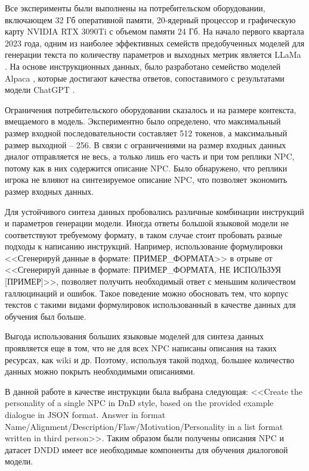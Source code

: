 Все эксперименты были выполнены на потребительском оборудовании, включающем 32 Гб оперативной памяти, 20-ядерный процессор и графическую карту NVIDIA RTX 3090Ti с объемом памяти 24 Гб. На начало первого квартала 2023 года, одним из наиболее эффективных семейств предобученных моделей для генерации текста по количеству параметров и выходных метрик является LLaMa \cite{llama-paper}. На основе инструкционных данных, было разработано семейство моделей Alpaca \cite{alpaca-docs}, которые достигают качества ответов, сопоставимого с результатами модели ChatGPT \cite{chatgpt-docs}.

Ограничения потребительского оборудовании сказалось и на размере контекста, вмещаемого в модель. Экспериментно было определено, что максимальный размер входной последовательности составляет 512 токенов, а максимальный размер выходной -- 256. В связи с ограничениями на размер входных данных диалог отправляется не весь, а только лишь его часть и при том реплики NPC, потому как в них содержится описание NPC. Было обнаружено, что реплики игрока не влияют на синтезируемое описание NPC, что позволяет экономить размер входных данных. 

Для устойчивого синтеза данных пробовались различные комбинации инструкций и параметров генерации модели. Иногда ответы большой языковой модели не соответствуют требуемому формату, в таком случае стоит пробовать разные подходы к написанию инструкций. Например, использование формулировки <<Сгенерируй данные в формате: ПРИМЕР\_ФОРМАТА>> в отрыве от <<Сгенерируй данные в формате: ПРИМЕР\_ФОРМАТА, НЕ ИСПОЛЬЗУЯ [ПРИМЕР]>>, позволяет получить необходимый ответ с меньшим количеством галлюцинаций и ошибок. Такое поведение можно обосновать тем, что корпус текстов с такими видами формулировок использованный в качестве данных для обучения был больше.

Выгода использования больших языковые моделей для синтеза данных проявляется еще в том, что не для всех NPC написаны описания на таких ресурсах, как wiki и др. Поэтому, используя такой подход, большее количество данных можно покрыть необходимыми описаниями.

В данной работе в качестве инструкции была выбрана следующая: <<Create the personality of a single NPC in DnD style, based on the provided example dialogue in JSON format. Answer in format Name/Alignment/Description/Flaw/Motivation/Personality in a list format written in third person>>. Таким образом были получены описания NPC и датасет DNDD имеет все необходимые компоненты для обучения диалоговой модели.

